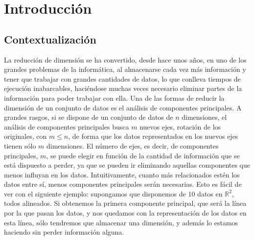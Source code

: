 %
%


\chapter{Introducción}
\setcounter{page}{1}

\section{Contextualización}
La reducción de dimensión se ha convertido, desde hace unos años, en uno de los grandes problemas de la informática, al almacenarse cada vez más información y tener que trabajar con grandes cantidades de datos, lo que conlleva tiempos de ejecución inabarcables, haciéndose muchas veces necesario eliminar partes de la información para poder trabajar con ella. Una de las formas de reducir la dimensión de un conjunto de datos es el análisis de componentes principales. A grandes rasgos, si se dispone de un conjunto de datos de $n$ dimensiones, el análisis de componentes principales busca $m$ nuevos ejes, rotación de los originales, con $m \leq n$, de forma que los datos representados en los nuevos ejes tienen sólo $m$ dimensiones. El número de ejes, es decir, de componentes principales, $m$, se puede elegir en función de la cantidad de información que se está dispuesto a perder, ya que se pueden ir eliminando aquellas componentes que menos influyan en los datos. Intuitivamente, cuanto más relacionados estén los datos entre sí, menos componentes principales serán necesarias. Esto es fácil de ver con el siguiente ejemplo: supongamos que disponemos de 10 datos en $\mathbb{R}^2$, todos alineados. Si obtenemos la primera componente principal, que será la línea por la que pasan los datos, y nos quedamos con la representación de los datos en esta línea, sólo tendremos que almacenar una dimensión, y además lo estamos haciendo sin perder información alguna.\\

